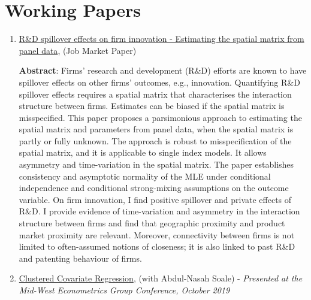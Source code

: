 \documentclass[12pt,letterpaper]{article}
\begin{document}
\section*{Working Papers} %
\begin{enumerate}
	\item  \href{https://estsyawo.github.io/Tsyawo_JMP.pdf#}{R\&D spillover effects on firm innovation - Estimating the spatial matrix from panel data}, (Job Market Paper)
	
	\textbf{Abstract}: Firms' research and development (R\&D) efforts are known to have spillover effects on other firms' outcomes, e.g., innovation. Quantifying R\&D spillover effects requires a spatial matrix
	that characterises the interaction structure between firms. Estimates can be biased if the
	spatial matrix is misspecified. This paper proposes a parsimonious approach to estimating
	the spatial matrix and parameters from panel data, when the spatial matrix is partly or fully
	unknown. The approach is robust to misspecification of the spatial matrix, and it is applicable
	to single index models. It allows asymmetry and time-variation in the spatial matrix. The paper
	establishes consistency and asymptotic normality of the MLE under conditional independence
	and conditional strong-mixing assumptions on the outcome variable. On firm innovation, I
	find positive spillover and private effects of R\&D. I provide evidence of time-variation and
	asymmetry in the interaction structure between firms and find that geographic proximity and
	product market proximity are relevant. Moreover, connectivity between firms is not limited to
	often-assumed notions of closeness; it is also linked to past R\&D and patenting behaviour of
	firms.
	
	\item \href{https://papers.ssrn.com/sol3/papers.cfm?abstract_id=3394012}{Clustered Covariate Regression}, (with Abdul-Nasah Soale) - \textit{Presented at the Mid-West Econometrics Group Conference, October 2019}
	
	

\end{enumerate}
\end{document}
